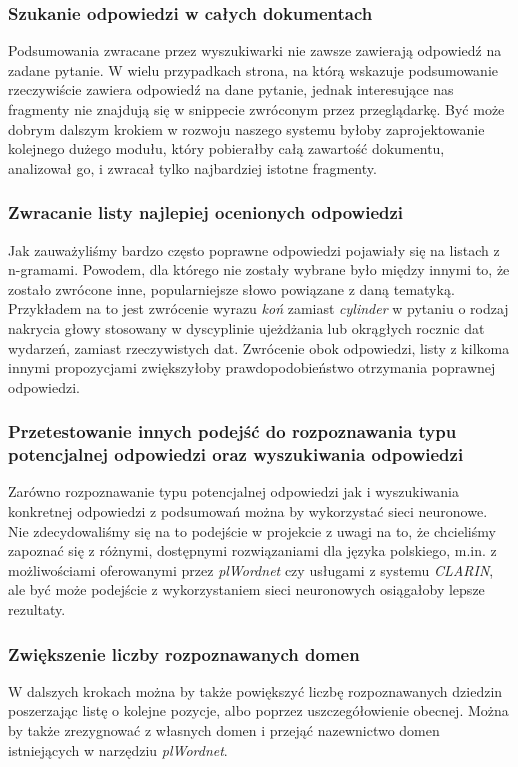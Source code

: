 \subsubsection{Szukanie odpowiedzi w całych dokumentach}
Podsumowania zwracane przez wyszukiwarki nie zawsze zawierają odpowiedź na zadane pytanie. W wielu przypadkach strona, na którą wskazuje podsumowanie rzeczywiście zawiera odpowiedź na dane pytanie, jednak interesujące nas fragmenty nie znajdują się w snippecie zwróconym przez przeglądarkę. Być może dobrym dalszym krokiem w rozwoju naszego systemu byłoby zaprojektowanie kolejnego dużego modułu, który pobierałby całą zawartość dokumentu, analizował go, i zwracał tylko najbardziej istotne fragmenty.

\subsubsection{Zwracanie listy najlepiej ocenionych odpowiedzi}
Jak zauważyliśmy bardzo często poprawne odpowiedzi pojawiały się na listach z n-gramami. Powodem, dla którego nie zostały wybrane było między innymi to, że zostało zwrócone inne, popularniejsze słowo powiązane z daną tematyką. Przykładem na to jest zwrócenie wyrazu \emph{koń} zamiast \emph{cylinder} w pytaniu o rodzaj nakrycia głowy stosowany w dyscyplinie ujeżdżania lub okrągłych rocznic dat wydarzeń, zamiast rzeczywistych dat. Zwrócenie obok odpowiedzi, listy z kilkoma innymi propozycjami zwiększyłoby prawdopodobieństwo otrzymania poprawnej odpowiedzi.

\subsubsection{Przetestowanie innych podejść do rozpoznawania typu potencjalnej odpowiedzi oraz wyszukiwania odpowiedzi}
Zarówno rozpoznawanie typu potencjalnej odpowiedzi jak i wyszukiwania konkretnej odpowiedzi z podsumowań można by wykorzystać sieci neuronowe. Nie zdecydowaliśmy się na to podejście w projekcie z uwagi na to, że chcieliśmy zapoznać się z różnymi, dostępnymi rozwiązaniami dla języka polskiego, m.in. z możliwościami oferowanymi przez \emph{plWordnet} czy usługami z systemu \emph{CLARIN}, ale być może podejście z wykorzystaniem sieci neuronowych osiągałoby lepsze rezultaty.

\subsubsection{Zwiększenie liczby rozpoznawanych domen}
W dalszych krokach można by także powiększyć liczbę rozpoznawanych dziedzin poszerzając listę o kolejne pozycje, albo poprzez uszczegółowienie obecnej. Można by także zrezygnować z własnych domen i przejąć nazewnictwo domen istniejących w narzędziu \emph{plWordnet}. 

